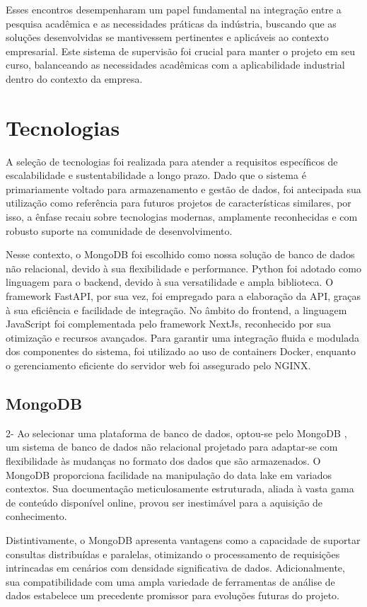 Esses encontros desempenharam um papel fundamental na integração entre a pesquisa acadêmica e as necessidades práticas da indústria, buscando que as soluções desenvolvidas se mantivessem pertinentes e aplicáveis ao contexto empresarial. Este sistema de supervisão foi crucial para manter o projeto em seu curso, balanceando as necessidades acadêmicas com a aplicabilidade industrial dentro do contexto da empresa.


\section[Tecnologias]{Tecnologias}
A seleção de tecnologias foi realizada para atender a requisitos específicos de escalabilidade e sustentabilidade a longo prazo. Dado que o sistema é primariamente voltado para armazenamento e gestão de dados, foi antecipada sua utilização como referência para futuros projetos de características similares, por isso, a ênfase recaiu sobre tecnologias modernas, amplamente reconhecidas e com robusto suporte na comunidade de desenvolvimento.

Nesse contexto, o MongoDB foi escolhido como nossa solução de banco de dados não relacional, devido à sua flexibilidade e performance. Python foi adotado como linguagem para o backend, devido à sua versatilidade e ampla biblioteca. O framework FastAPI, por sua vez, foi empregado para a elaboração da \gls{API}, graças à sua eficiência e facilidade de integração. No âmbito do frontend, a linguagem JavaScript foi complementada pelo framework NextJs, reconhecido por sua otimização e recursos avançados. Para garantir uma integração fluida e modulada dos componentes do sistema, foi utilizado ao uso de containers Docker, enquanto o gerenciamento eficiente do servidor web foi assegurado pelo NGINX.

\subsection{MongoDB}
2-
Ao selecionar uma plataforma de banco de dados, optou-se pelo MongoDB \cite{mongodbDocs}, um sistema de banco de dados não relacional projetado para adaptar-se com flexibilidade às mudanças no formato dos dados que são armazenados. O MongoDB proporciona facilidade na manipulação do data lake em variados contextos. Sua documentação meticulosamente estruturada, aliada à vasta gama de conteúdo disponível online, provou ser inestimável para a aquisição de conhecimento.

Distintivamente, o MongoDB apresenta vantagens como a capacidade de suportar consultas distribuídas e paralelas, otimizando o processamento de requisições intrincadas em cenários com densidade significativa de dados. Adicionalmente, sua compatibilidade com uma ampla variedade de ferramentas de análise de dados estabelece um precedente promissor para evoluções futuras do projeto.

